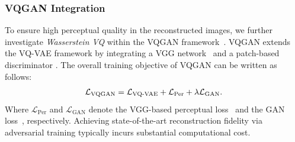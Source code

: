 


\subsubsection{VQGAN Integration}
\label{sec:VQGAN}
To ensure high perceptual quality in the reconstructed images, we further investigate \emph{Wasserstein VQ} within the VQGAN framework~\citep{Esser2020TamingTF}. VQGAN extends the VQ-VAE framework by integrating a VGG network~\citep{Simonyan2014VeryDC}  and a patch-based discriminator \citep{Esser2020TamingTF, Johnson2016PerceptualLF}. The overall training objective of VQGAN can be written as follows:
\begin{align}
\label{eq:vqgan}
\mathcal{L}_{\text{VQGAN}} = \mathcal{L}_{\text{VQ-VAE}} + \mathcal{L}_{\text{Per}} + \lambda \mathcal{L}_{\text{GAN}}.
\vspace{-2ex}
\end{align}
Where $\mathcal{L}_{\text{Per}}$ and $\mathcal{L}_{\text{GAN}}$ denote the VGG-based perceptual loss~\citep{Zhang2018TheUE} and the GAN loss~\citep{Isola2016ImagetoImageTW, Lim2017GeometricG}, respectively. Achieving state-of-the-art reconstruction fidelity via adversarial training typically incurs substantial computational cost. 
